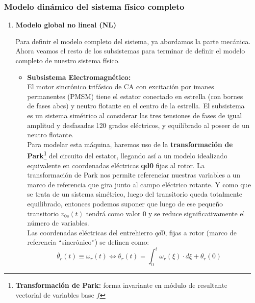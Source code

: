 \documentclass[10pt]{article}
\begin{document}
\subsubsection{Modelo dinámico del sistema físico completo}

\begin{enumerate}
    \renewcommand{\theenumi}{\alph{enumi}} %
    \item \textbf{Modelo global no lineal (NL)}
    
    Para definir el modelo completo del sistema, ya abordamos la parte mecánica. Ahora veamos el resto de los subsistemas para terminar de definir el modelo completo de nuestro sistema físico.
	\begin{itemize}
		\item \textbf{Subsistema Electromagnético:}\vspace{0.3cm}\\
		El motor sincrónico trifásico de CA con excitación por imanes permanentes (PMSM) tiene el estator conectado en estrella (con bornes de fases abcs) y neutro flotante en el centro de la estrella.
		El subsistema es un sistema simétrico al considerar las tres tensiones de fases de igual amplitud y desfasadas 120 grados eléctricos, y equilibrado al poseer de un neutro flotante.
		\vspace{0.3cm}\\
		Para modelar esta máquina, haremos uso de la \textbf{transformación de Park}\footnote[1]{\textbf{Transformación de Park:} forma invariante en módulo de resultante vectorial de variables base $f$} del circuito del estator, llegando así a un modelo idealizado equivalente en coordenadas eléctricas \textbf{qd0} fijas al rotor.
		La transformación de Park nos permite referenciar nuestras variables a un marco de referencia que gira junto al campo eléctrico rotante.
		Y como que se trata de un sistema simétrico, luego del transitorio queda totalmente equilibrado, entonces podemos suponer que luego de ese pequeño transitorio $v_{0s}(t)$ tendrá como valor $0$ y se reduce significativamente el número de variables.
		\vspace{0.3cm}\\
		Las coordenadas eléctricas del entrehierro $qd0$, fijas a rotor (marco de referencia “sincrónico”) se definen como:
		\begin{equation}
			\dot{\theta_{r}}\left ( t \right )\equiv \omega_{r}\left ( t \right )\Leftrightarrow \theta_{r}\left ( t \right )=\int_{0}^{t}\omega_{r}\left ( \xi \right )\cdot d\xi + \theta_{r}\left ( 0 \right )

\end{equation}
\end{itemize}
\end{enumerate}
\end{document}
